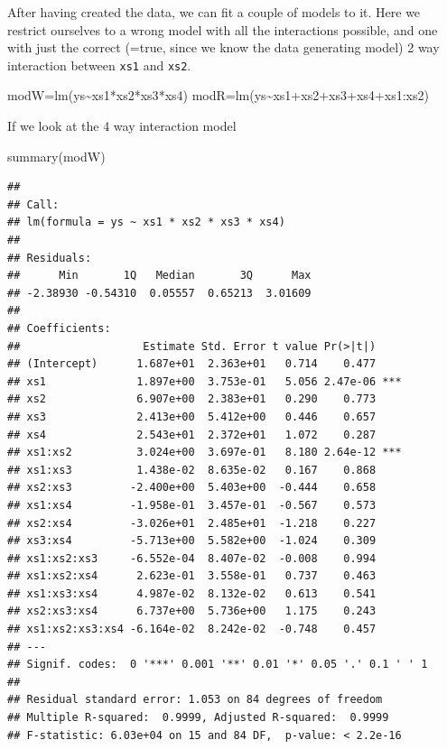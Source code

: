 \documentclass[
]{book}
\newenvironment{Shaded}{\begin{snugshade}}{\end{snugshade}}
\newcommand{\FunctionTok}[1]{\textcolor[rgb]{0.00,0.00,0.00}{#1}}
\newcommand{\NormalTok}[1]{#1}
\newcommand{\OtherTok}[1]{\textcolor[rgb]{0.56,0.35,0.01}{#1}}
\newcommand{\SpecialCharTok}[1]{\textcolor[rgb]{0.00,0.00,0.00}{#1}}
\begin{document}
After having created the data, we can fit a couple of models to it. Here we restrict ourselves to a wrong model with all the interactions possible, and one with just the correct (=true, since we know the data generating model) 2 way interaction between \texttt{xs1} and \texttt{xs2}.

\begin{Shaded}
\begin{Highlighting}[]
\NormalTok{modW}\OtherTok{=}\FunctionTok{lm}\NormalTok{(ys}\SpecialCharTok{\textasciitilde{}}\NormalTok{xs1}\SpecialCharTok{*}\NormalTok{xs2}\SpecialCharTok{*}\NormalTok{xs3}\SpecialCharTok{*}\NormalTok{xs4)}
\NormalTok{modR}\OtherTok{=}\FunctionTok{lm}\NormalTok{(ys}\SpecialCharTok{\textasciitilde{}}\NormalTok{xs1}\SpecialCharTok{+}\NormalTok{xs2}\SpecialCharTok{+}\NormalTok{xs3}\SpecialCharTok{+}\NormalTok{xs4}\SpecialCharTok{+}\NormalTok{xs1}\SpecialCharTok{:}\NormalTok{xs2)}
\end{Highlighting}
\end{Shaded}

If we look at the 4 way interaction model

\begin{Shaded}
\begin{Highlighting}[]
\FunctionTok{summary}\NormalTok{(modW)}
\end{Highlighting}
\end{Shaded}

\begin{verbatim}
## 
## Call:
## lm(formula = ys ~ xs1 * xs2 * xs3 * xs4)
## 
## Residuals:
##      Min       1Q   Median       3Q      Max 
## -2.38930 -0.54310  0.05557  0.65213  3.01609 
## 
## Coefficients:
##                   Estimate Std. Error t value Pr(>|t|)    
## (Intercept)      1.687e+01  2.363e+01   0.714    0.477    
## xs1              1.897e+00  3.753e-01   5.056 2.47e-06 ***
## xs2              6.907e+00  2.383e+01   0.290    0.773    
## xs3              2.413e+00  5.412e+00   0.446    0.657    
## xs4              2.543e+01  2.372e+01   1.072    0.287    
## xs1:xs2          3.024e+00  3.697e-01   8.180 2.64e-12 ***
## xs1:xs3          1.438e-02  8.635e-02   0.167    0.868    
## xs2:xs3         -2.400e+00  5.403e+00  -0.444    0.658    
## xs1:xs4         -1.958e-01  3.457e-01  -0.567    0.573    
## xs2:xs4         -3.026e+01  2.485e+01  -1.218    0.227    
## xs3:xs4         -5.713e+00  5.582e+00  -1.024    0.309    
## xs1:xs2:xs3     -6.552e-04  8.407e-02  -0.008    0.994    
## xs1:xs2:xs4      2.623e-01  3.558e-01   0.737    0.463    
## xs1:xs3:xs4      4.987e-02  8.132e-02   0.613    0.541    
## xs2:xs3:xs4      6.737e+00  5.736e+00   1.175    0.243    
## xs1:xs2:xs3:xs4 -6.164e-02  8.242e-02  -0.748    0.457    
## ---
## Signif. codes:  0 '***' 0.001 '**' 0.01 '*' 0.05 '.' 0.1 ' ' 1
## 
## Residual standard error: 1.053 on 84 degrees of freedom
## Multiple R-squared:  0.9999, Adjusted R-squared:  0.9999 
## F-statistic: 6.03e+04 on 15 and 84 DF,  p-value: < 2.2e-16
\end{verbatim}
\end{document}
